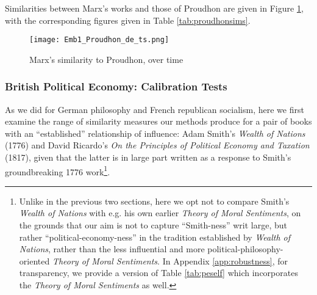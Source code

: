 Similarities between Marx's works and those of Proudhon are given in Figure \ref{fig:proudhonsims}, with the corresponding figures given in Table \ref{tab:proudhonsims}.

\begin{figure}
    \texttt{[image: Emb1\_Proudhon\_de\_ts.png]}
    \caption{Marx's similarity to Proudhon, over time}
    \label{fig:proudhonsims}
\end{figure}




\subsubsection{British Political Economy: Calibration Tests}

As we did for German philosophy and French republican socialism, here we first examine the range of similarity measures our methods produce for a pair of books with an ``established'' relationship of influence: Adam Smith's \textit{Wealth of Nations} (1776) and David Ricardo's \textit{On the Principles of Political Economy and Taxation} (1817), given that the latter is in large part written as a response to Smith's groundbreaking 1776 work\footnote{Unlike in the previous two sections, here we opt not to compare Smith's \textit{Wealth of Nations} with e.g. his own earlier \textit{Theory of Moral Sentiments}, on the grounds that our aim is not to capture ``Smith-ness'' writ large, but rather ``political-economy-ness'' in the tradition established by \textit{Wealth of Nations}, rather than the less influential and more political-philosophy-oriented \textit{Theory of Moral Sentiments}. In Appendix \ref{app:robustness}, for transparency, we provide a version of Table \ref{tab:peself} which incorporates the \textit{Theory of Moral Sentiments} as well.}.



